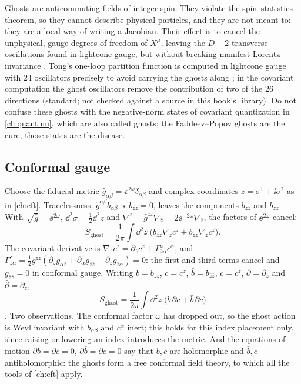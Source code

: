 \begin{physicsbox}
Ghosts are anticommuting fields of integer spin. They violate the spin--statistics theorem,
so they cannot describe physical particles, and they are not meant to: they are a local way
of writing a Jacobian. Their effect is to cancel the unphysical, gauge degrees of freedom of
$X^\mu$, leaving the $D-2$ transverse oscillations found in lightcone gauge, but without
breaking manifest Lorentz invariance . Tong's
one-loop partition function is computed in lightcone gauge with $24$ oscillators precisely
to avoid carrying the ghosts along ; in the covariant
computation the ghost oscillators remove the contribution of two of the $26$ directions
(standard; not checked against a source in this book's library). Do not confuse these ghosts with the negative-norm states of covariant quantization
in \cref{ch:quantum}, which are also called ghosts; the Faddeev--Popov ghosts are the cure,
those states are the disease.
\end{physicsbox}

\subsection{Conformal gauge}

Choose the fiducial metric $\hat g_{\alpha\beta}=\ee^{2\omega}\delta_{\alpha\beta}$ and
complex coordinates $z=\sigma^1+\ii\sigma^2$ as in \cref{ch:cft}. Tracelessness,
$\hat g^{\alpha\beta}b_{\alpha\beta}\propto b_{z\bar z}=0$, leaves the components $b_{zz}$ and
$b_{\bar z\bar z}$. With $\sqrt{\hat g}=\ee^{2\omega}$, $\dd^2\sigma=\tfrac12\dd^2z$ and
$\nabla^z=\hat g^{z\bar z}\nabla_{\bar z}=2\ee^{-2\omega}\nabla_{\bar z}$, the factors of
$\ee^{2\omega}$ cancel:
\[
  S_{\mathrm{ghost}}=\frac{1}{2\pi}\int\dd^2z\;
  \bigl(b_{zz}\nabla_{\bar z}c^z+b_{\bar z\bar z}\nabla_z c^{\bar z}\bigr).
\]
The covariant derivative is $\nabla_{\bar z}c^z=\partial_{\bar z}c^z+\Gamma^z_{\bar z\alpha}c^\alpha$,
and $\Gamma^z_{\bar z\alpha}=\tfrac12 g^{z\bar z}(\partial_{\bar z}g_{\alpha\bar z}
+\partial_\alpha g_{\bar z\bar z}-\partial_{\bar z}g_{\bar z\alpha})=0$: the first and third
terms cancel and $g_{\bar z\bar z}=0$ in conformal gauge. Writing
$b=b_{zz}$, $c=c^z$, $\bar b=b_{\bar z\bar z}$, $\bar c=c^{\bar z}$, $\partial=\partial_z$ and
$\bar\partial=\partial_{\bar z}$,
\begin{equation}\label{eq:ghosts:Sbc}
  S_{\mathrm{ghost}}=\frac{1}{2\pi}\int\dd^2z\;\bigl(b\,\bar\partial c+\bar b\,\partial\bar c\bigr)
\end{equation}
. Two observations. The conformal factor $\omega$
has dropped out, so the ghost action is Weyl invariant with $b_{\alpha\beta}$ and $c^\alpha$
inert; this holds for this index placement only, since raising or lowering an index
introduces the metric. And the equations of motion $\bar\partial b=\bar\partial c=0$,
$\partial\bar b=\partial\bar c=0$ say that $b,c$ are holomorphic and $\bar b,\bar c$
antiholomorphic: the ghosts form a free conformal field theory, to which all the tools of
\cref{ch:cft} apply.

